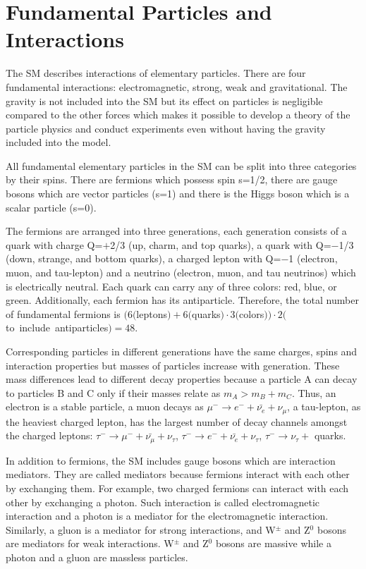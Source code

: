 \section{Fundamental Particles and Interactions}
\label{sec:Intro_FundParticles}

The SM describes interactions of elementary particles. There are four fundamental interactions: electromagnetic, strong, weak and gravitational. The gravity is not included into the SM but its effect on particles is negligible compared to the other forces which makes it possible to develop a theory of the particle physics and conduct experiments even without having the gravity included into the model. 

All fundamental elementary particles in the SM can be split into three categories by their spins. There are fermions which possess spin s=1/2, there are gauge bosons which are vector particles (s=1) and there is the Higgs boson which is a scalar particle (s=0). 

The fermions are arranged into three generations, each generation consists of a quark with charge Q=$+$2/3 (up, charm, and top quarks), a quark with Q=$-$1/3 (down, strange, and bottom quarks), a charged lepton with Q=$-$1 (electron, muon, and tau-lepton) and a neutrino (electron, muon, and tau neutrinos) which is electrically neutral. Each quark can carry any of three colors: red, blue, or green. Additionally, each fermion has its antiparticle. Therefore, the total number of fundamental fermions is $(6 ($leptons$)+6 ($quarks$) \cdot 3 ($colors$) ) \cdot 2 ($to~include~antiparticles$) = 48$. 

Corresponding particles in different generations have the same charges, spins and interaction properties but masses of particles increase with generation. These mass differences lead to different decay properties because a particle A can decay to particles B and C only if their masses relate as $m_A > m_B + m_C$. Thus, an electron is a stable particle, a muon decays as $\mu^- \rightarrow e^- + \bar{\nu_e} + \nu_\mu$, a tau-lepton, as the heaviest charged lepton, has the largest number of decay channels amongst the charged leptons: $\tau^- \rightarrow \mu^- + \bar{\nu_\mu} + \nu_\tau$, $\tau^- \rightarrow e^- + \bar{\nu_e} + \nu_\tau$,  $\tau^- \rightarrow \nu_\tau +$ quarks. 

In addition to fermions, the SM includes gauge bosons which are interaction mediators. They are called mediators because fermions interact with each other by exchanging them. For example, two charged fermions can interact with each other by exchanging a photon. Such interaction is called electromagnetic interaction and a photon is a mediator for the electromagnetic interaction. Similarly, a gluon is a mediator for strong interactions, and W$^{\pm}$ and Z$^0$ bosons are mediators for weak interactions. W$^{\pm}$ and Z$^0$ bosons are massive while a photon and a gluon are massless particles. 

